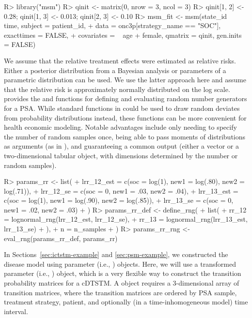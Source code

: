 \documentclass[article, nojss]{jss}\usepackage[]{graphicx}\usepackage[]{color}
\begin{document}
\begin{Schunk}
\begin{Sinput}
R> library("msm")
R> qinit <- matrix(0, nrow = 3, ncol = 3)
R> qinit[1, 2] <-  0.28; qinit[1, 3] <-  0.013; qinit[2, 3] <-  0.10
R> msm_fit <- msm(state_id ~ time, subject = patient_id, 
+    data = onc3p[strategy_name == "SOC"], exacttimes = FALSE,
+    covariates = ~ age + female, qmatrix = qinit, gen.inits = FALSE)
\end{Sinput}
\end{Schunk}



We assume that the relative treatment effects were estimated as relative risks. Either a posterior distribution from a Bayesian analysis or parameters of a parametric distribution can be used. We use the latter approach here and assume that the relative risk is approximately normally distributed on the log scale.  provides the  and  functions for defining and evaluating random number generators for a PSA. While standard functions in  could be used to draw random deviates from probability distributions instead, these functions can be more convenient for health economic modeling. Notable advantages include only needing to specify the number of random samples once, being able to pass moments of distributions as arguments (as in ), and guaranteeing a common output (either a vector or a two-dimensional tabular object, with dimensions determined by the number or random samples). 

\begin{Schunk}
\begin{Sinput}
R> params_rr <- list(
+    lrr_12_est = c(soc = log(1), new1 = log(.80), new2 = log(.71)),
+    lrr_12_se = c(soc = 0, new1 = .03, new2 = .04),
+    lrr_13_est = c(soc = log(1), new1 = log(.90), new2 = log(.85)),
+    lrr_13_se = c(soc = 0, new1 = .02, new2 = .03)
+  )  
R> params_rr_def <- define_rng({
+    list(
+      rr_12 = lognormal_rng(lrr_12_est, lrr_12_se),
+      rr_13 = lognormal_rng(lrr_13_est, lrr_13_se)
+    )}, 
+    n = n_samples
+  )
R> params_rr_rng <- eval_rng(params_rr_def, params_rr)
\end{Sinput}
\end{Schunk}

In Sections~\ref{sec:ictstm-example} and \ref{sec:psm-example}, we constructed the disease model using parameter (i.e., ) objects. Here, we will use a transformed parameter (i.e., ) object, which is a very flexible way to construct the transition probability matrices for a cDTSTM. A  object requires a 3-dimensional array of transition matrices, where the transition matrices are ordered by PSA sample, treatment strategy, patient, and optionally (in a time-inhomogeneous model) time interval.
\end{document}
